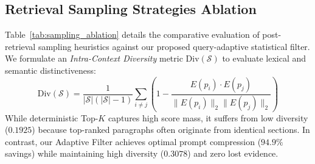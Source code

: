 \documentclass[lettersize,journal]{IEEEtran}
\begin{document}
\begin{table}[!t]
\caption{Positional Telemetry Across Haystack Depths\label{tab:mitm_table}}
\centering
{}
\end{table}

\subsection{Retrieval Sampling Strategies Ablation}
Table~\ref{tab:sampling_ablation} details the comparative evaluation of post-retrieval sampling heuristics against our proposed query-adaptive statistical filter. We formulate an \textit{Intra-Context Diversity} metric $\text{Div}(\mathcal{S})$ to evaluate lexical and semantic distinctiveness:
\begin{equation}
\label{eq:diversity_metric}
\text{Div}(\mathcal{S}) = \frac{1}{|\mathcal{S}|(|\mathcal{S}|-1)} \sum_{i \ne j} \left( 1 - \frac{E(p_i) \cdot E(p_j)}{\|E(p_i)\|_2 \|E(p_j)\|_2} \right)
\end{equation}
While deterministic Top-$K$ captures high score mass, it suffers from low diversity ($0.1925$) because top-ranked paragraphs often originate from identical sections. In contrast, our Adaptive Filter achieves optimal prompt compression ($94.9\%$ savings) while maintaining high diversity ($0.3078$) and zero lost evidence.
\end{document}
